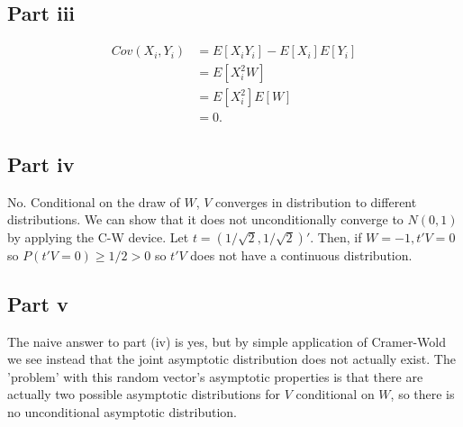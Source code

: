 \documentclass[11pt]{article} %
\begin{document}
\subsection{Part iii}
\begin{align*}
Cov(X_i,Y_i) &= E[X_iY_i] - E[X_i] E[Y_i]\\
&= E[X_i^2 W]\\
&= E[X_i^2]E[W]\\
&= 0.
\end{align*}
\subsection{Part iv}
No. Conditional on the draw of $W$, $V$ converges in distribution to different distributions. We can show that it does not unconditionally converge to $N(0,1)$ by applying the C-W device. Let $t = (1/\sqrt{2}, 1/\sqrt{2})'$. Then, if $W=-1, t'V = 0$ so $P(t'V=0)\geq 1/2>0$ so $t'V$ does not have a continuous distribution.
\subsection{Part v}
The naive answer to part (iv) is yes, but by simple application of Cramer-Wold we see instead that the joint asymptotic distribution does not actually exist. The 'problem' with this random vector's asymptotic properties is that there are actually two possible asymptotic distributions for $V$ conditional on $W$, so there is no unconditional asymptotic distribution.
\end{document}
